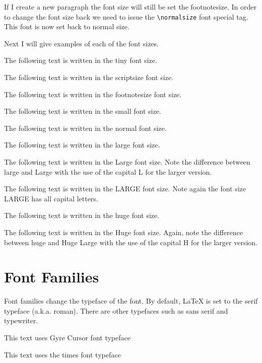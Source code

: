 \vspace{0.4cm}

If I create a new paragraph the font size will still be set the footnotesize. In order to change the font size back we need to issue the \verb|\normalsize| font special tag. \normalsize This font is now set back to normal size.     

\vspace{0.4cm}

Next I will give examples of each of the font sizes. 

\vspace{0.4cm}


The following text is written in the {\tiny tiny font size.} 

The following text is written in the {\scriptsize scriptsize font size.} 

The following text is written in the {\footnotesize footnotesize font size.} 

The following text is written in the {\small small font size.} 

The following text is written in the {\normalsize normal font size.} 

The following text is written in the {\large large font size.} 

The following text is written in the {\Large Large font size.} Note the difference between large and Large with the use of the capital L for the larger version. 

The following text is written in the {\LARGE LARGE font size.} Note again the font size LARGE has all capital letters.

The following text is written in the {\huge huge font size.} 

The following text is written in the {\Huge Huge font size.} Again, note the difference between huge and Huge Large with the use of the capital H for the larger version. 

\newpage

\section{Font Families}

Font families change the typeface of the font. By default, LaTeX is set to the serif typeface (a.k.a. roman). There are other typefaces such as sans serif and typewriter.

{\selectfont This text uses Gyre Cursor font typeface}

{\selectfont This text uses the times font typeface}

